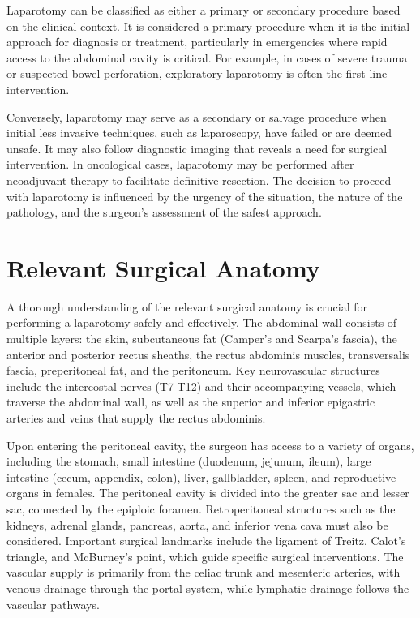 Laparotomy can be classified as either a primary or secondary procedure based on the clinical context. It is considered a primary procedure when it is the initial approach for diagnosis or treatment, particularly in emergencies where rapid access to the abdominal cavity is critical. For example, in cases of severe trauma or suspected bowel perforation, exploratory laparotomy is often the first-line intervention.

Conversely, laparotomy may serve as a secondary or salvage procedure when initial less invasive techniques, such as laparoscopy, have failed or are deemed unsafe. It may also follow diagnostic imaging that reveals a need for surgical intervention. In oncological cases, laparotomy may be performed after neoadjuvant therapy to facilitate definitive resection. The decision to proceed with laparotomy is influenced by the urgency of the situation, the nature of the pathology, and the surgeon's assessment of the safest approach.

\section*{Relevant Surgical Anatomy}
A thorough understanding of the relevant surgical anatomy is crucial for performing a laparotomy safely and effectively. The abdominal wall consists of multiple layers: the skin, subcutaneous fat (Camper's and Scarpa's fascia), the anterior and posterior rectus sheaths, the rectus abdominis muscles, transversalis fascia, preperitoneal fat, and the peritoneum. Key neurovascular structures include the intercostal nerves (T7-T12) and their accompanying vessels, which traverse the abdominal wall, as well as the superior and inferior epigastric arteries and veins that supply the rectus abdominis.

Upon entering the peritoneal cavity, the surgeon has access to a variety of organs, including the stomach, small intestine (duodenum, jejunum, ileum), large intestine (cecum, appendix, colon), liver, gallbladder, spleen, and reproductive organs in females. The peritoneal cavity is divided into the greater sac and lesser sac, connected by the epiploic foramen. Retroperitoneal structures such as the kidneys, adrenal glands, pancreas, aorta, and inferior vena cava must also be considered. Important surgical landmarks include the ligament of Treitz, Calot's triangle, and McBurney's point, which guide specific surgical interventions. The vascular supply is primarily from the celiac trunk and mesenteric arteries, with venous drainage through the portal system, while lymphatic drainage follows the vascular pathways.

